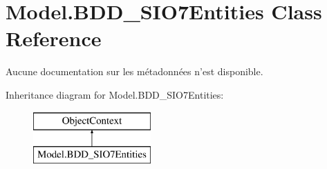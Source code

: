 \hypertarget{class_model_1_1_b_d_d___s_i_o7_entities}{\section{Model.\-B\-D\-D\-\_\-\-S\-I\-O7\-Entities Class Reference}
\label{class_model_1_1_b_d_d___s_i_o7_entities}
}


Aucune documentation sur les métadonnées n'est disponible.  


Inheritance diagram for Model.\-B\-D\-D\-\_\-\-S\-I\-O7\-Entities\-:\begin{figure}[H]
\begin{center}
\leavevmode
\includegraphics[height=2.000000cm]{class_model_1_1_b_d_d___s_i_o7_entities}
\end{center}
\end{figure}

